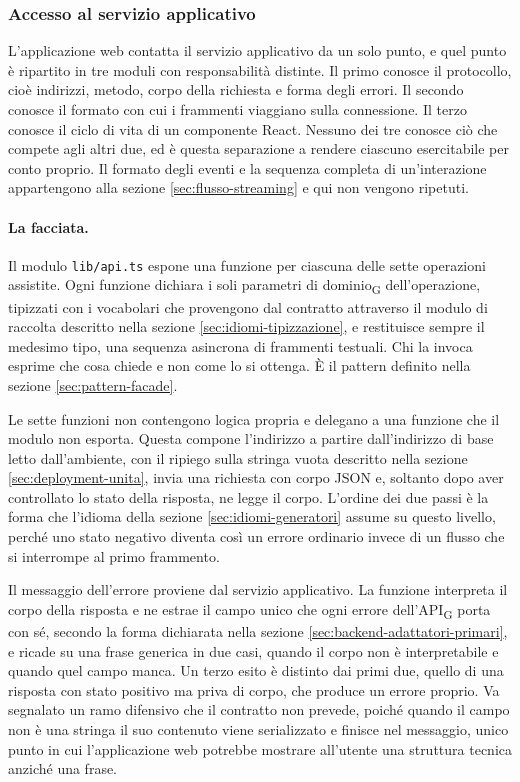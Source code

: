\documentclass[a4paper, 10pt]{article}
\begin{document}
\subsubsection{Accesso al servizio applicativo}
\label{sec:frontend-accesso-servizio}

L'applicazione web contatta il servizio applicativo da un solo punto, e quel punto è ripartito in tre moduli con responsabilità distinte. Il primo conosce il protocollo, cioè indirizzi, metodo, corpo della richiesta e forma degli errori. Il secondo conosce il formato con cui i frammenti viaggiano sulla connessione. Il terzo conosce il ciclo di vita di un componente React. Nessuno dei tre conosce ciò che compete agli altri due, ed è questa separazione a rendere ciascuno esercitabile per conto proprio. Il formato degli eventi e la sequenza completa di un'interazione appartengono alla sezione \ref{sec:flusso-streaming} e qui non vengono ripetuti.

\paragraph{La facciata.}
Il modulo \texttt{lib/api.ts} espone una funzione per ciascuna delle sette operazioni assistite. Ogni funzione dichiara i soli parametri di dominio\textsubscript{G} dell'operazione, tipizzati con i vocabolari che provengono dal contratto attraverso il modulo di raccolta descritto nella sezione \ref{sec:idiomi-tipizzazione}, e restituisce sempre il medesimo tipo, una sequenza asincrona di frammenti testuali. Chi la invoca esprime che cosa chiede e non come lo si ottenga. È il pattern definito nella sezione \ref{sec:pattern-facade}.

Le sette funzioni non contengono logica propria e delegano a una funzione che il modulo non esporta. Questa compone l'indirizzo a partire dall'indirizzo di base letto dall'ambiente, con il ripiego sulla stringa vuota descritto nella sezione \ref{sec:deployment-unita}, invia una richiesta con corpo JSON e, soltanto dopo aver controllato lo stato della risposta, ne legge il corpo. L'ordine dei due passi è la forma che l'idioma della sezione \ref{sec:idiomi-generatori} assume su questo livello, perché uno stato negativo diventa così un errore ordinario invece di un flusso che si interrompe al primo frammento.

Il messaggio dell'errore proviene dal servizio applicativo. La funzione interpreta il corpo della risposta e ne estrae il campo unico che ogni errore dell'API\textsubscript{G} porta con sé, secondo la forma dichiarata nella sezione \ref{sec:backend-adattatori-primari}, e ricade su una frase generica in due casi, quando il corpo non è interpretabile e quando quel campo manca. Un terzo esito è distinto dai primi due, quello di una risposta con stato positivo ma priva di corpo, che produce un errore proprio. Va segnalato un ramo difensivo che il contratto non prevede, poiché quando il campo non è una stringa il suo contenuto viene serializzato e finisce nel messaggio, unico punto in cui l'applicazione web potrebbe mostrare all'utente una struttura tecnica anziché una frase.
\end{document}

